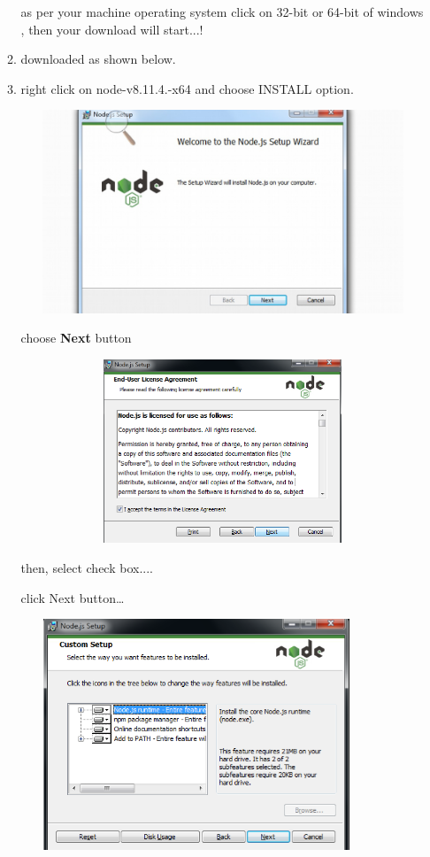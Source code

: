 \documentclass{article}
\begin{document}
\begin{enumerate}
\begin{enumerate}
\begin{center}
			 \end{center}
		  as per your machine operating system click on 32-bit or 64-bit of windows , then your download will start...!
		  \item downloaded as shown below.
		  \item right click on node-v8.11.4.-x64 and choose INSTALL option.
		  \begin{center}
		  	\includegraphics*[width=5.70in, height=2.39in]{IMG-01-04}
		  \end{center}
	  	\noindent choose \textbf{Next} button
	  	
	  	\begin{center}
	  		\noindent \includegraphics*[width=5.08in, height=2.16in]{IMG-01-05}
	  	\end{center}
	  	
	  	\noindent then, select check box....  
	  	
	  	\noindent click Next button{\dots}
	  	
	  	\begin{center}
	  		\noindent \includegraphics*[width=4.13in, height=2.72in]{IMG-01-06}
	  	\end{center}
	  	

\end{enumerate}
\end{enumerate}
\end{document}
